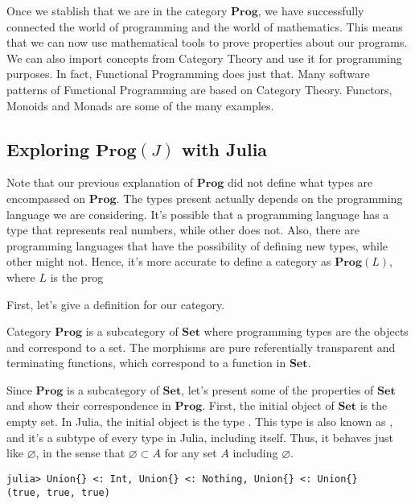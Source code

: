 Once we stablish that we are in the category $\mathbf{Prog}$, we have successfully
connected the world of programming and the world of mathematics.
This means that we can now use mathematical tools to prove properties
about our programs. We can also import concepts from Category
Theory and use it for programming purposes. In fact, Functional Programming does just that.
Many software patterns of Functional Programming are based on Category Theory.
Functors, Monoids and Monads are some of the many examples.


\subsection{Exploring $\mathbf{Prog}(J)$ with Julia}

Note that our previous explanation of $\mathbf{Prog}$ did not define
what types are encompassed on $\mathbf{Prog}$. The types
present actually depends on the programming language we are considering.
It's possible that a programming language has a type that represents real numbers,
while other does not. Also, there are programming languages that have the possibility
of defining new types, while other might not. Hence, it's more accurate
to define a category as $\mathbf{Prog}(L)$, where $L$ is the prog

First, let's give a definition for our category.
\begin{definition}
	Category $\mathbf{Prog}$ is a subcategory of $\mathbf{Set}$ where programming
	types are the objects and correspond to a set. The morphisms are pure
	referentially transparent and terminating functions, which correspond to
	a function in $\mathbf{Set}$.
\end{definition}

Since $\mathbf{Prog}$ is a subcategory of $\mathbf{Set}$, let's present
some of the properties of $\mathbf{Set}$ and show their correspondence in $\mathbf{Prog}$.
First, the initial object of $\mathbf{Set}$ is the empty set.
In Julia, the initial object is the type .
This type is also known as , and it's a subtype of every type in Julia, including
itself. Thus, it behaves just like $\varnothing$, in the sense that $\varnothing \subset A$
for any set $A$ including $\varnothing$.

\bigskip
\begin{lstlisting}[language=JuliaLocal, style=julia, texcl=true]
julia> Union{} <: Int, Union{} <: Nothing, Union{} <: Union{}
(true, true, true)
\end{lstlisting}

